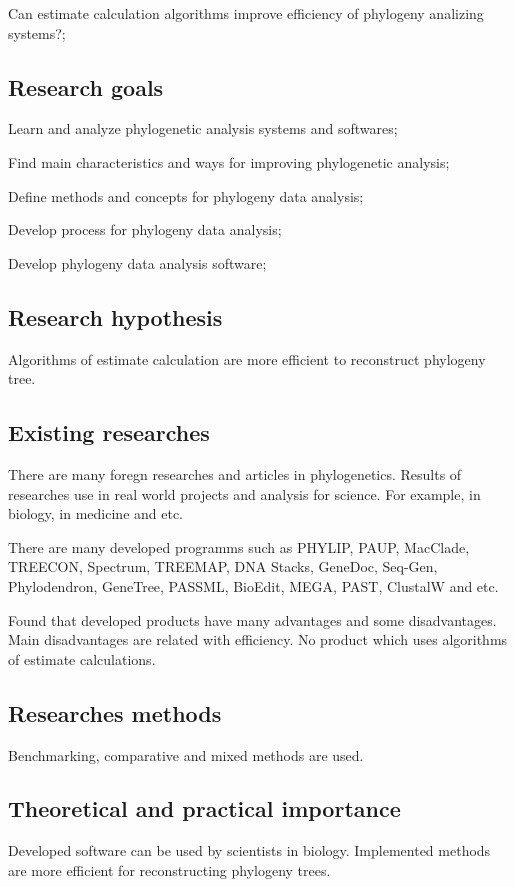 Can estimate calculation algorithms improve efficiency of phylogeny 
analizing systems?;

\subsection*{Research goals} 

Learn and analyze phylogenetic analysis systems and softwares;

Find main characteristics and ways for improving phylogenetic analysis;

Define methods and concepts for phylogeny data analysis;

Develop process for phylogeny data analysis;	

Develop phylogeny data analysis software; 

\subsection*{Research hypothesis}
Algorithms of estimate calculation are more efficient to 
reconstruct phylogeny tree.

\subsection*{Existing researches}
There are many foregn researches and articles in phylogenetics.
Results of researches use in real world projects
and analysis for science. For example, in biology, in medicine and etc.

There are many developed programms such as PHYLIP, PAUP, MacClade, 
TREECON, Spectrum, TREEMAP, DNA Stacks, GeneDoc, Seq-Gen, 
Phylodendron, GeneTree, PASSML, BioEdit, MEGA, PAST, ClustalW and etc.

Found that developed products have many advantages and some 
disadvantages. Main disadvantages are related with efficiency. 
No product which uses algorithms of estimate calculations.

\subsection*{Researches methods}
Benchmarking, comparative and mixed methods are used.

\subsection*{Theoretical and practical importance}
Developed software can be used by scientists in biology.
Implemented methods are more efficient for reconstructing
phylogeny trees.

